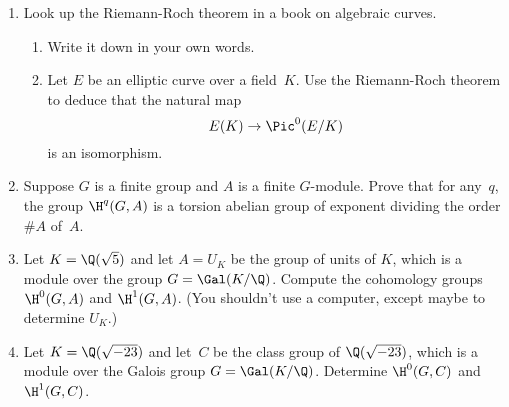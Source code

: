\begin{enumerate}




\item Look up the Riemann-Roch theorem in a book on algebraic curves.
\begin{enumerate}
\item Write it down in your own words.
\item Let $E$ be an elliptic curve over a field~$K$.
Use the Riemann-Roch theorem to deduce that the natural map
$$E(K) \to \Pic^0(E/K)$$
is an isomorphism.  
\end{enumerate}


\item Suppose $G$ is a finite group and $A$ is a finite $G$-module.
  Prove that for any~$q$, the group $\H^q(G,A)$ is a torsion abelian group of
  exponent dividing the order $\#A$ of~$A$.

\item Let $K=\Q(\sqrt{5})$ and let $A=U_K$ be the group of units of
  $K$, which is a module over the group $G=\Gal(K/\Q)$.  Compute the
  cohomology groups $\H^0(G,A)$ and $\H^1(G,A)$.  (You shouldn't use
  a computer, except maybe to determine $U_K$.)

\item Let $K=\Q(\sqrt{-23})$ and let~$C$ be the class group of
$\Q(\sqrt{-23})$, which is a module over the Galois group $G=\Gal(K/\Q)$. 
Determine $\H^0(G,C)$ and $\H^1(G,C)$.  


\end{enumerate}
